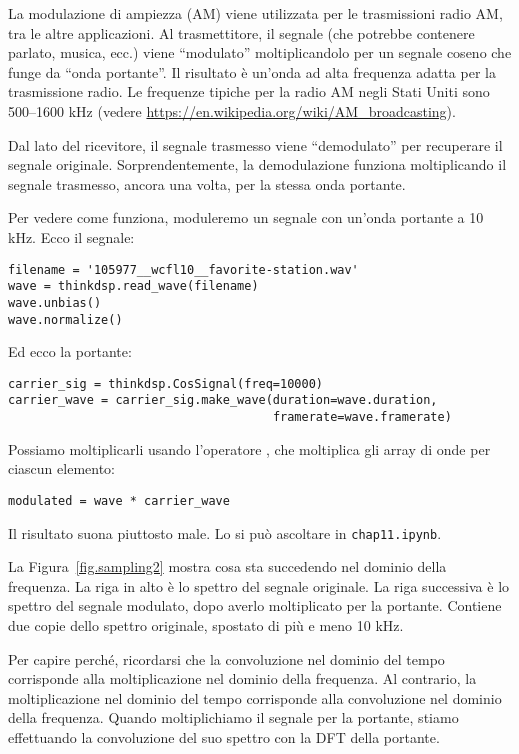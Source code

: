 \documentclass[12pt]{book} \usepackage[width=5.5in,height=8.5in, hmarginratio=3:2,vmarginratio=1:1]{geometry}
\begin{document}
La modulazione di ampiezza (AM) viene utilizzata per le trasmissioni radio AM, tra le altre applicazioni. Al trasmettitore, il segnale (che potrebbe contenere parlato, musica, ecc.) viene ``modulato'' moltiplicandolo per un segnale coseno che funge da ``onda portante''. Il risultato è un'onda ad alta frequenza adatta per la trasmissione radio. Le frequenze tipiche per la radio AM negli Stati Uniti sono 500--1600 kHz (vedere \url{https://en.wikipedia.org/wiki/AM_broadcasting}).

Dal lato del ricevitore, il segnale trasmesso viene ``demodulato'' per recuperare il segnale originale. Sorprendentemente, la demodulazione funziona moltiplicando il segnale trasmesso, ancora una volta, per la stessa onda portante.

Per vedere come funziona, moduleremo un segnale con un'onda portante a 10 kHz. Ecco il segnale:

\begin{verbatim} 
filename = '105977__wcfl10__favorite-station.wav'
wave = thinkdsp.read_wave(filename)
wave.unbias()
wave.normalize()
 \end{verbatim} 

Ed ecco la portante:

\begin{verbatim} 
carrier_sig = thinkdsp.CosSignal(freq=10000)
carrier_wave = carrier_sig.make_wave(duration=wave.duration,
                                     framerate=wave.framerate)
 \end{verbatim} 

Possiamo moltiplicarli usando l'operatore {\tt *}, che moltiplica gli array di onde per ciascun elemento:

\begin{verbatim} 
modulated = wave * carrier_wave
 \end{verbatim} 

Il risultato suona piuttosto male. Lo si può ascoltare in {\tt chap11.ipynb}.

La Figura~\ref{fig.sampling2} mostra cosa sta succedendo nel dominio della frequenza. La riga in alto è lo spettro del segnale originale. La riga successiva è lo spettro del segnale modulato, dopo averlo moltiplicato per la portante. Contiene due copie dello spettro originale, spostato di più e meno 10 kHz.

Per capire perché, ricordarsi che la convoluzione nel dominio del tempo corrisponde alla moltiplicazione nel dominio della frequenza. Al contrario, la moltiplicazione nel dominio del tempo corrisponde alla convoluzione nel dominio della frequenza. Quando moltiplichiamo il segnale per la portante, stiamo effettuando la convoluzione del suo spettro con la DFT della portante.
\end{document}
